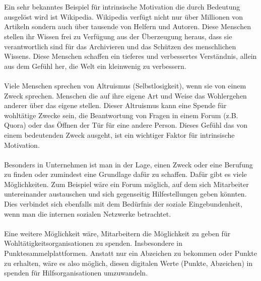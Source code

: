\documentclass[a4paper,12pt]{scrartcl}
\begin{document}
\\\\
Ein sehr bekanntes Beispiel für intrinsische Motivation die durch Bedeutung ausgelöst wird ist Wikipedia. Wikipedia verfügt nicht nur über Millionen von Artikeln sondern auch über tausende von Helfern und Autoren. Diese Menschen stellen ihr Wissen frei zu Verfügung aus der Überzeugung heraus, dass sie verantwortlich sind für das Archivieren und das Schützen des menschlichen Wissens. Diese Menschen schaffen ein tieferes und verbessertes Verständnis, allein aus dem Gefühl her, die Welt ein kleinwenig zu verbessern.
\\\\
Viele Menschen sprechen von Altruismus (Selbstlosigkeit), wenn sie von einem Zweck sprechen. Menschen die auf ihre eigene Art und Weise das Wohlergehen anderer über das eigene stellen. Dieser Altruismus kann eine Spende für wohltätige Zwecke sein, die Beantwortung von Fragen in einem Forum (z.B. Quora) oder das Öffnen der Tür für eine andere Person. Dieses Gefühl das von einem bedeutenden Zweck ausgeht, ist ein wichtiger Faktor für intrinsische Motivation.
\\\\
Besonders in Unternehmen ist man in der Lage, einen Zweck oder eine Berufung zu finden oder zumindest eine Grundlage dafür zu schaffen. Dafür gibt es viele Möglichkeiten. Zum Beispiel wäre ein Forum möglich, auf dem sich Mitarbeiter untereinander austauschen und sich gegenseitig Hilfestellungen geben könnten. Dies verbindet sich ebenfalls mit dem Bedürfnis der soziale Eingebundenheit, wenn man die internen sozialen Netzwerke betrachtet.
\\\\ 
Eine weitere Möglichkeit wäre, Mitarbeitern die Möglichkeit zu geben für Wohltätigkeitsorganisationen zu spenden. Insbesondere in Punktesammelplattformen. Anstatt nur ein Abzeichen zu bekommen oder Punkte zu erhalten, wäre es also möglich, diesen digitalen Werte (Punkte, Abzeichen) in spenden für Hilfsorganisationen umzuwandeln.
\end{document}
